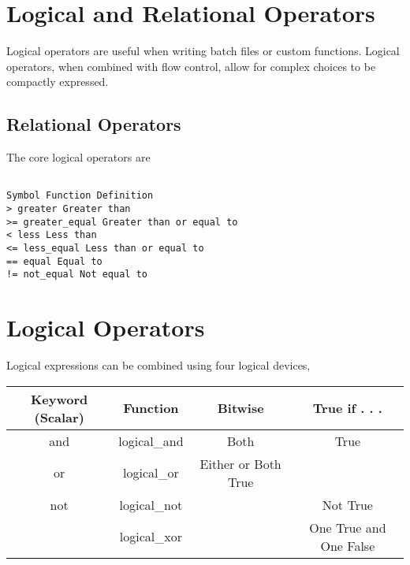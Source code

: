 \documentclass[KSmain.tex]{subfiles}
\begin{document}
 

\section{Logical and Relational Operators}
Logical operators are useful when writing batch files or custom functions. Logical operators, when combined
with flow control, allow for complex choices to be compactly expressed.

\subsection{Relational Operators}


The core logical operators are
\begin{verbatim}

Symbol Function Definition
> greater Greater than
>= greater_equal Greater than or equal to
< less Less than
<= less_equal Less than or equal to
== equal Equal to
!= not_equal Not equal to
\end{verbatim}

\section{Logical Operators}

Logical expressions can be combined using four logical devices,

\begin{tabular}{|c|c|c|c|}
	\hline Keyword (Scalar) & Function & Bitwise & True if . . . \\ \hline
	and & logical\_and & Both & True \\ \hline
	or  & logical\_or & Either or Both True \\ \hline
	not & logical\_not & ~ & Not True \\ \hline
	& logical\_xor & \wedge & One True and One False \\ \hline
\end{tabular} 
\end{document}
